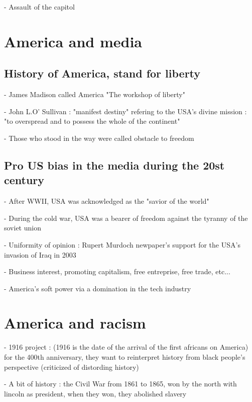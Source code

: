 \documentclass[10pt]{article}
\begin{document}
- Assault of the capitol





\section*{America and media}

\subsection*{History of America, stand for liberty}

- James Madison called America "The workshop of liberty"

- John L.O' Sullivan : "manifest destiny" refering to the USA's divine 
mission : "to overspread and to possess the whole of the continent"

- Those who stood in the way were called obstacle to freedom

\subsection*{Pro US bias in the media during the 20st century}

- After WWII, USA was acknowledged as the "savior of the world"

- During the cold war, USA was a bearer of freedom against the tyranny of 
the soviet union

- Uniformity of opinion : Rupert Murdoch newpaper's support for the USA's
 invasion of Iraq in 2003

- Business interest, promoting capitalism, free entreprise, free trade,
etc...

- America's soft power via a domination in the tech industry





\section*{America and racism}

- 1916 project : (1916 is the date of the arrival of the first africans on 
America) for the 400th anniversary, they want to reinterpret history from 
black people's perspective (criticized of distording history)

- A bit of history : the Civil War from 1861 to 1865, won by the north with 
lincoln as president, when they won, they abolished slavery
\end{document}
